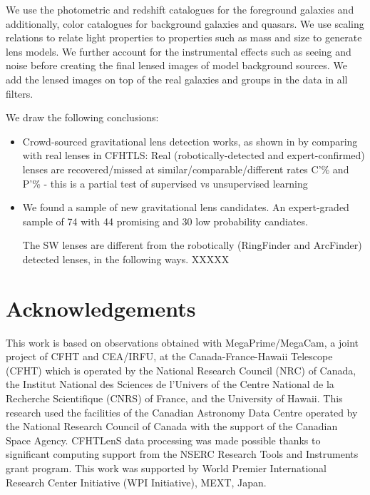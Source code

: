 \documentclass[useAMS,usenatbib,a4paper]{mn2e}
\begin{document}
We use the photometric and redshift catalogues for the foreground galaxies and
additionally, color catalogues for background galaxies and quasars. We
use scaling relations to relate light properties to properties such as mass and
size to generate lens models. We further account for the
instrumental effects such as seeing and noise before creating the final lensed
images of model background sources. We add the lensed images on top of the real
galaxies and groups in the \cfhtls data in all filters.

We draw the following conclusions:

\begin{itemize} 

\item Crowd-sourced gravitational lens detection works, as shown in by comparing with real lenses in CFHTLS:
Real (robotically-detected and expert-confirmed) lenses are
recovered/missed at similar/comparable/different rates C’\% and P’\% - this is a partial test of supervised vs unsupervised learning


\item We found a sample of new gravitational lens candidates. An
expert-graded sample of 74 with 44 promising and 30 low probability
candiates.

The SW lenses are different from the robotically (RingFinder and ArcFinder) detected lenses, in the following ways.
XXXXX


\end{itemize}



\section*{Acknowledgements}
 

This work is based on observations obtained with MegaPrime/MegaCam, a joint
project of CFHT and CEA/IRFU, at the Canada-France-Hawaii Telescope (CFHT) which
is operated by the National Research Council (NRC) of Canada, the Institut
National des Sciences de l'Univers of the Centre National de la Recherche
Scientifique (CNRS) of France, and the University of Hawaii. This research used
the facilities of the Canadian Astronomy Data Centre operated by the National
Research Council of Canada with the support of the Canadian Space Agency.
CFHTLenS data processing was made possible thanks to significant computing
support from the NSERC Research Tools and Instruments grant program.
This work was supported by World Premier International Research Center
Initiative (WPI Initiative), MEXT, Japan.
\end{document}
